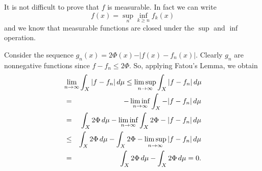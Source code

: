 \documentclass[12pt]{article}
\begin{document}
It is not difficult to prove that $f$ is measurable. In fact we can write 
\[
  f(x)=\sup_n \inf_{k\ge n} f_k(x)
\]
and we know that measurable functions are closed under the $\sup$ and $\inf$ operation.

Consider the sequence $g_n(x)=2\Phi(x) - \vert f(x)-f_n(x)\vert$.
Clearly $g_n$ are nonnegative functions since $f-f_n\le 2\Phi$.
So, applying Fatou's Lemma, we obtain
\begin{eqnarray*}
\lefteqn{\lim_{n\to\infty} \int_X \vert f-f_n\vert\, d\mu 
\le \limsup_{n\to \infty} \int_X \vert f-f_n\vert\, d\mu}\\
& = & - \liminf_{n\to\infty} \int_X -\vert f-f_n\vert\, d\mu \\
& = & \int_X 2\Phi\, d\mu - \liminf_{n\to\infty}\int_X 2\Phi-\vert f-f_n\vert\,d\mu\\
& \le & \int_X 2\Phi\, d\mu - \int_X 2\Phi - \limsup_{n\to \infty}\vert f-f_n\vert\, d\mu \\
&= & \int_X 2\Phi\, d\mu - \int_X 2\Phi\, d\mu = 0.
\end{eqnarray*}
\end{document}
